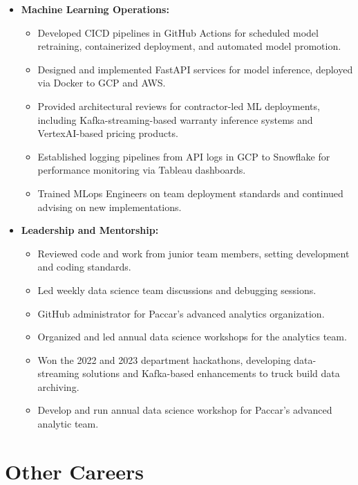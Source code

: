 \documentclass[12pt,a4paper]{moderncv}
\begin{document}
{\begin{itemize}
    \item \textbf{Machine Learning Operations:}
    \begin{itemize}
        \item Developed CICD pipelines in GitHub Actions for scheduled model retraining, containerized deployment, and automated model promotion.
        \item Designed and implemented FastAPI services for model inference, deployed via Docker to GCP and AWS.
        \item Provided architectural reviews for contractor-led ML deployments, including Kafka-streaming-based warranty inference systems and VertexAI-based pricing products.
        \item Established logging pipelines from API logs in GCP to Snowflake for performance monitoring via Tableau dashboards.
        \item Trained MLops Engineers on team deployment standards and continued advising on new implementations.
    \end{itemize}

    \item \textbf{Leadership and Mentorship:}
    \begin{itemize}
        \item Reviewed code and work from junior team members, setting development and coding standards.
        \item Led weekly data science team discussions and debugging sessions.
        \item GitHub administrator for Paccar's advanced analytics organization.
        \item Organized and led annual data science workshops for the analytics team.
        \item Won the 2022 and 2023 department hackathons, developing data-streaming solutions and Kafka-based enhancements to truck build data archiving.
        \item Develop and run annual data science workshop for Paccar's advanced analytic team.
    \end{itemize}
\end{itemize}
}

\section{Other Careers}
\end{document}
